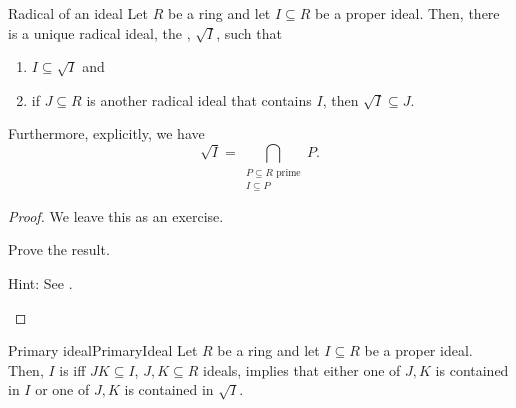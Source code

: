 \begin{thm}{Radical of an ideal}{}
	Let $R$ be a ring and let $I\subseteq R$ be a proper ideal.  Then, there is a unique radical ideal, the , $\sqrt{I}$, such that
	\begin{enumerate}
		\item $I\subseteq \sqrt{I}$ and
		\item if $J\subseteq R$ is another radical ideal that contains $I$, then $\sqrt{I}\subseteq J$.
	\end{enumerate}
	Furthermore, explicitly, we have
	\begin{equation}
		\sqrt{I}=\bigcap _{\substack{P\subseteq R\text{ prime} \\ I\subseteq P}}P.
	\end{equation}
	\begin{proof}
		We leave this as an exercise.
		\begin{exr}[breakable=false]{}{}
			Prove the result.
			\begin{rmk}
				Hint:  See \cite[Theorem 10.7]{Lam}.
			\end{rmk}
		\end{exr}
	\end{proof}
\end{thm}
\begin{dfn}{Primary ideal}{PrimaryIdeal}
	Let $R$ be a ring and let $I\subseteq R$ be a proper ideal.  Then, $I$ is  iff $JK\subseteq I$, $J,K\subseteq R$ ideals, implies that either one of $J,K$ is contained in $I$ or one of $J,K$ is contained in $\sqrt{I}$.
\end{dfn}
